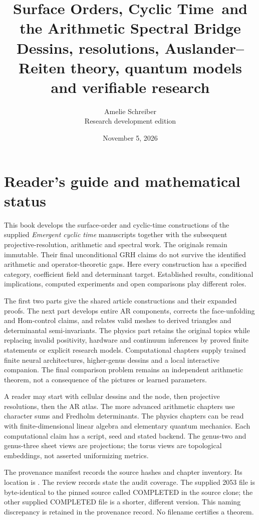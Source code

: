 \documentclass[11pt,oneside,openany]{book}
\title{Surface Orders, Cyclic Time\ and the Arithmetic Spectral Bridge\\[1em]\large Dessins, resolutions, Auslander--Reiten theory, quantum models and verifiable research}
\author{Amelie Schreiber\\\small Research development edition}
\date{November 5, 2026}
\theoremstyle{definition}\newtheorem{definition}[theorem]{Definition}
\theoremstyle{remark}\newtheorem{remark}[theorem]{Remark}
\begin{document}
\frontmatter\hypersetup{pageanchor=false}\maketitle\clearpage\hypersetup{pageanchor=true}
\chapter*{Reader's guide and mathematical status}
This book develops the surface-order and cyclic-time constructions of the supplied \emph{Emergent cyclic time} manuscripts together with the subsequent projective-resolution, arithmetic and spectral work. The originals remain immutable. Their final unconditional GRH claims do not survive the identified arithmetic and operator-theoretic gaps. Here every construction has a specified category, coefficient field and determinant target. Established results, conditional implications, computed experiments and open comparisons play different roles.

The first two parts give the shared article constructions and their expanded proofs. The next part develops entire AR components, corrects the face-unfolding and Hom-control claims, and relates valid meshes to derived triangles and determinantal semi-invariants. The physics part retains the original topics while replacing invalid positivity, hardware and continuum inferences by proved finite statements or explicit research models. Computational chapters supply trained finite neural architectures, higher-genus dessins and a local interactive companion. The final comparison problem remains an independent arithmetic theorem, not a consequence of the pictures or learned parameters.

A reader may start with cellular dessins and the node, then projective resolutions, then the AR atlas. The more advanced arithmetic chapters use character sums and Fredholm determinants. The physics chapters can be read with finite-dimensional linear algebra and elementary quantum mechanics. Each computational claim has a script, seed and stated backend. The genus-two and genus-three sheet views are projections; the torus views are topological embeddings, not asserted uniformizing metrics.

The provenance manifest records the source hashes and chapter inventory. Its location is . The review records state the audit coverage. The supplied 2053 file is byte-identical to the pinned source called COMPLETED in the source clone; the other supplied COMPLETED file is a shorter, different version. This naming discrepancy is retained in the provenance record. No filename certifies a theorem.
\end{document}
